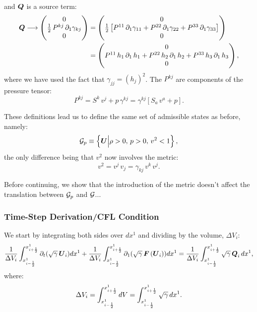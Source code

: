 \documentclass[10pt,preprint]{aastex}
\begin{document}
and $\bQ$ is a source term:
\begin{align}
    \bQ\longrightarrow\begin{pmatrix}0\\\f{1}{2}\,P^{kj}\,\pd{\gamma_{kj}}{1}\\0\end{pmatrix}&=\begin{pmatrix}0\\ \f{1}{2}\left[P^{11}\,\pd{\gamma_{11}}{1}+P^{22}\,\pd{\gamma_{22}}{1}+P^{33}\,\pd{\gamma_{33}}{1}\right] \\0\end{pmatrix}\\
    &=\begin{pmatrix}0\\ P^{11}\,h_{1}\,\pd{\,h_{1}}{1}+P^{22}\,h_{2}\,\pd{\,h_{2}}{1}+P^{33}\,h_{3}\,\pd{\,h_{3}}{1} \\0\end{pmatrix},
\end{align}
where we have used the fact that $\gamma_{jj}=\left(h_{j}\right)^{2}$. The $P^{kj}$ are components of the pressure tensor:
\begin{equation}
    P^{kj}=S^{k}\,v^{j}+p\,\gamma^{kj}=\gamma^{kj}\left[S_{a}\,v^{a}+p\right].
\end{equation}

These definitions lead us to define the same set of admissible states as before, namely:
\begin{equation}
    \cG_{p}\equiv\left\{\bU\Big|\rho>0,\,p>0,\,v^{2}<1\right\},
\end{equation}
the only difference being that $v^{2}$ now involves the metric:
\begin{equation}
    v^{2}=v^{j}\,v_{j}=\gamma_{kj}\,v^{k}\,v^{j}.
\end{equation}

Before continuing, we show that the introduction of the metric doesn't affect the translation between $\cG_{p}$ and $\cG$...

\subsubsection{Time-Step Derivation/CFL Condition}
We start by integrating both sides over $dx^{1}$ and dividing by the volume, $\Delta V_{i}$:
\begin{equation}
    \f{1}{\Delta V_{i}}\int_{x^{1}_{\imh}}^{x^{1}_{\iph}}\pd{\left(\sqrtgm\,\bU_{i}\right)}{t}dx^{1}+\f{1}{\Delta V_{i}}\int_{x^{1}_{\imh}}^{x^{1}_{\iph}}\pd{\left(\sqrtgm\,\bF\left(\bU_{i}\right)\right)}{1}dx^{1}=\f{1}{\Delta V_{i}}\int_{x^{1}_{\imh}}^{x^{1}_{\iph}}\sqrtgm\,\bQ_{i}\,dx^{1},
\end{equation}
where:
\begin{equation}
    \Delta V_{i}=\int_{x^{1}_{\imh}}^{x^{1}_{\iph}}dV=\int_{x^{1}_{\imh}}^{x^{1}_{\iph}}\sqrtgm\,dx^{1}.
\end{equation}
\end{document}
